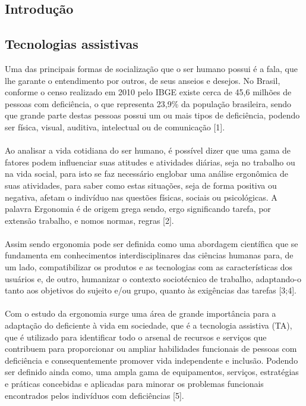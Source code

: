 \documentclass[twoside]{article}
\begin{document}
\begin{multicols}{2} %

\section{Introdução}
\subsection{Tecnologias assistivas}
Uma das principais formas de socialização que o ser humano possui é a fala, que lhe garante o entendimento por outros, de seus anseios e desejos. No Brasil, conforme o censo realizado em 2010 pelo IBGE existe cerca de 45,6 milhões de pessoas com deficiência, o que representa 23,9\% da população brasileira, sendo que grande parte destas pessoas possui um ou mais tipos de deficiência, podendo ser física, visual, auditiva, intelectual ou de comunicação [1].
\\\\
Ao analisar a vida cotidiana do ser humano, é possível dizer que uma gama de fatores podem influenciar suas atitudes e atividades diárias, seja no trabalho ou na vida social, para isto se faz necessário englobar uma análise ergonômica de suas atividades, para saber como estas situações, seja de forma positiva ou negativa, afetam o indivíduo nas questões físicas, sociais ou psicológicas.  A palavra Ergonomia é de origem grega sendo, ergo significando tarefa, por extensão trabalho, e nomos normas, regras [2].
\\\\
Assim sendo ergonomia pode ser definida como uma abordagem científica que se fundamenta em conhecimentos interdisciplinares das ciências humanas para, de um lado, compatibilizar os produtos e as tecnologias com as características dos usuários e, de outro, humanizar o contexto sociotécnico de trabalho, adaptando-o tanto aos objetivos do sujeito e/ou grupo, quanto às exigências das tarefas [3;4]. 
\\\\
Com o estudo da ergonomia surge uma área de grande importância para a adaptação do deficiente à vida em sociedade, que é a tecnologia assistiva (TA), que é utilizado para identificar todo o arsenal de recursos e serviços que contribuem para proporcionar ou ampliar habilidades funcionais de pessoas com deficiência e consequentemente promover vida independente e inclusão. Podendo ser definido ainda como, uma ampla gama de equipamentos, serviços, estratégias e práticas concebidas e aplicadas para minorar os problemas funcionais encontrados pelos indivíduos com deficiências [5].

\end{multicols}
\end{document}
